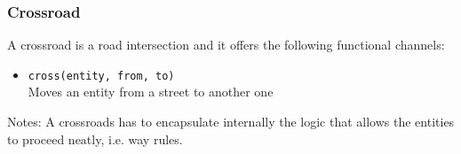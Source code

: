 \subsubsection{Crossroad}
A crossroad is a road intersection and it offers the following functional channels:
\begin{itemize}
	\item \texttt{cross(entity, from, to)}
	\\Moves an entity from a street to another one
\end{itemize}
Notes:
A crossroads has to encapsulate internally the logic that allows the entities to proceed neatly, i.e. way rules.